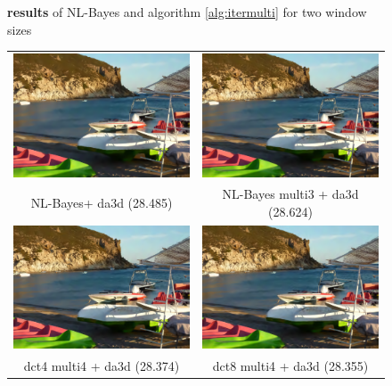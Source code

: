 \documentclass{ipol}
\begin{document}
\begin{figure}[htbp]
\begin{center}
\begin{tabular}{cc}
\end{tabular}
\caption{{\bf results} of NL-Bayes \cite{multiscaler2016} and algorithm \ref{alg:itermulti} for two window sizes}
\label{fig:itermulti}
\end{center}
\end{figure}


\begin{figure}[htbp]
\begin{center}
\begin{tabular}{cc}

\includegraphics[width = .44\textwidth]{f/nlb_da3d} &
\includegraphics[width = .44\textwidth]{f/nlb_multi3_da3d} \\
NL-Bayes+ da3d (28.485)    & NL-Bayes multi3 + da3d (28.624)  \\

\includegraphics[width = .44\textwidth]{f/dct4_multi4_da3d} &
\includegraphics[width = .44\textwidth]{f/dct8_multi4_da3d} \\
dct4 multi4 + da3d (28.374) &  dct8 multi4 + da3d (28.355)  \\


\end{tabular}
\end{center}
\end{figure}
\end{document}
